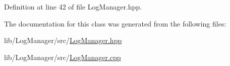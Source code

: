 Definition at line 42 of file Log\+Manager.\+hpp.



The documentation for this class was generated from the following files\+:\begin{DoxyCompactItemize}
\item 
lib/\+Log\+Manager/src/\hyperlink{_log_manager_8hpp}{Log\+Manager.\+hpp}\item 
lib/\+Log\+Manager/src/\hyperlink{_log_manager_8cpp}{Log\+Manager.\+cpp}\end{DoxyCompactItemize}
